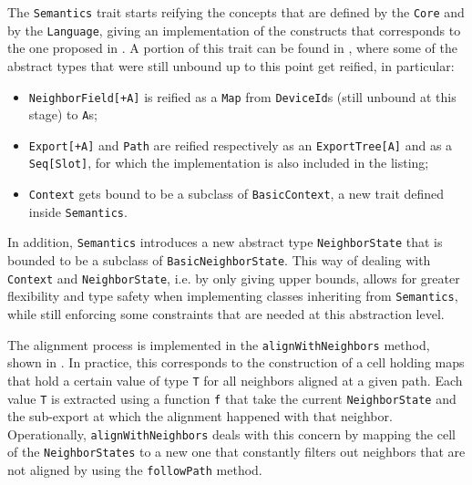 The \texttt{Semantics} trait starts reifying the concepts that are defined by the \texttt{Core} and by the \texttt{Language}, giving an implementation of the constructs that corresponds to the one proposed in .
%
A portion of this trait can be found in , where some of the abstract types that were still unbound up to this point get reified, in particular:
%
\begin{itemize}
    \item \texttt{NeighborField[+A]} is reified as a \texttt{Map} from \texttt{DeviceId}s (still unbound at this stage) to \texttt{A}s;
    \item \texttt{Export[+A]} and \texttt{Path} are reified respectively as an \texttt{ExportTree[A]} and as a \texttt{Seq[Slot]}, for which the implementation is also included in the listing;
    \item \texttt{Context} gets bound to be a subclass of \texttt{BasicContext}, a new trait defined inside \texttt{Semantics}.
\end{itemize}
%
In addition, \texttt{Semantics} introduces a new abstract type \texttt{NeighborState} that is bounded to be a subclass of \texttt{BasicNeighborState}.
%
This way of dealing with \texttt{Context} and \texttt{NeighborState}, i.e. by only giving upper bounds, allows for greater flexibility and type safety when implementing classes inheriting from \texttt{Semantics}, while still enforcing some constraints that are needed at this abstraction level.
%


The alignment process is implemented in the \texttt{alignWithNeighbors} method, shown in .
%
In practice, this corresponds to the construction of a cell holding maps that hold a certain value of type \texttt{T} for all neighbors aligned at a given path.
%
Each value \texttt{T} is extracted using a function \texttt{f} that take the current \texttt{NeighborState} and the sub-export at which the alignment happened with that neighbor.
%
Operationally, \texttt{alignWithNeighbors} deals with this concern by mapping the cell of the \texttt{NeighborStates} to a new one that constantly filters out neighbors that are not aligned by using the \texttt{followPath} method.
%


